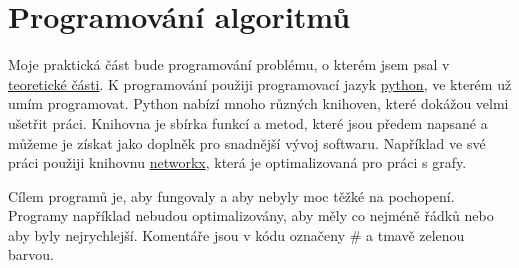 \chapter{Programování algoritmů}
\label{chap:programovani}

Moje praktická část bude programování problému, o kterém jsem psal v \hyperref[part:teoreticka-cast]{teoretické části}. K programování použiji programovací jazyk \href{https://www.python.org/}{python}, ve kterém už umím programovat. Python nabízí mnoho různých knihoven, které dokážou velmi ušetřit práci. Knihovna je sbírka funkcí a metod, které jsou předem napsané a můžeme je získat jako doplněk pro snadnější vývoj softwaru. Například ve své práci použiji knihovnu \href{https://networkx.org/}{networkx}, která je optimalizovaná pro práci s grafy. 

Cílem programů je, aby fungovaly a aby nebyly moc těžké na pochopení. Programy například nebudou optimalizovány, aby měly co nejméně řádků nebo aby byly nejrychlejší. Komentáře jsou v kódu označeny \textcolor{commentgreen}{\#} a \textcolor{commentgreen}{tmavě zelenou barvou}.

% 


